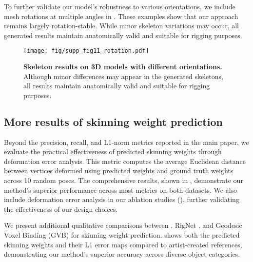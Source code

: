   To further validate our model’s robustness to various orientations, we include mesh rotations at multiple angles in . These examples show that our approach remains largely rotation-stable. While minor skeleton variations may occur, all generated results maintain anatomically valid and suitable for rigging purposes.

\begin{figure}
    \centering
\texttt{[image: fig/supp\_fig11\_rotation.pdf]}

    \caption{\textbf{Skeleton results on 3D models with different orientations.} Although minor differences may appear in the generated skeletons, all results maintain anatomically valid and suitable for rigging purposes.}
    \label{supp_rotation}
  \end{figure}
  
\subsection{More results of skinning weight prediction}
Beyond the precision, recall, and L1-norm metrics reported in the main paper, we evaluate the practical effectiveness of predicted skinning weights through deformation error analysis. This metric computes the average Euclidean distance between vertices deformed using predicted weights and ground truth weights across 10 random poses. The comprehensive results, shown in , demonstrate our method's superior performance across most metrics on both datasets. We also include deformation error analysis in our ablation studies (), further validating the effectiveness of our design choices.


We present additional qualitative comparisons between \ours{}, RigNet \cite{xu2020rignet}, and Geodesic Voxel Binding (GVB) \cite{dionne2013geodesic} for skinning weight prediction.  shows both the predicted skinning weights and their L1 error maps compared to artist-created references, demonstrating our method's superior accuracy across diverse object categories.


